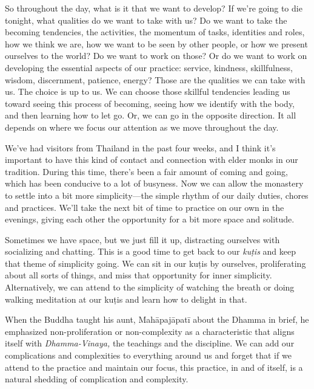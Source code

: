 So throughout the day, what is it that we want to develop? If we're 
going to die tonight, what qualities do we want to take with us? Do we 
want to take the becoming tendencies, the activities, the momentum of 
tasks, identities and roles, how we think we are, how we want to be 
seen by other people, or how we present ourselves to the world? Do we 
want to work on those? Or do we want to work on developing the 
essential aspects of our practice: service, kindness, skillfulness, 
wisdom, discernment, patience, energy? Those are the qualities we can 
take with us. The choice is up to us. We can choose those skillful 
tendencies leading us toward seeing this process of becoming, seeing 
how we identify with the body, and then learning how to let go. Or, we 
can go in the opposite direction. It all depends on where we focus our 
attention as we move throughout the day.


We've had visitors from Thailand in the past four weeks, and I think 
it's important to have this kind of contact and connection with elder 
monks in our tradition. During this time, there's been a fair amount of 
coming and going, which has been conducive to a lot of busyness. Now we 
can allow the monastery to settle into a bit more simplicity---the 
simple rhythm of our daily duties, chores and practices. We'll take the 
next bit of time to practice on our own in the evenings, giving each 
other the opportunity for a bit more space and solitude.

Sometimes we have space, but we just fill it up, distracting ourselves 
with socializing and chatting. This is a good time to get back to our 
\emph{kuṭis} and keep that theme of simplicity going. We can sit in 
our kuṭis by ourselves, proliferating about all sorts of things, and 
miss that opportunity for inner simplicity. Alternatively, we can 
attend to the simplicity of watching the breath or doing walking 
meditation at our kuṭis and learn how to delight in that.

When the Buddha taught his aunt, Mahāpajāpatī about the Dhamma in 
brief, he emphasized non-proliferation or non-complexity as a 
characteristic that aligns itself with \emph{Dhamma-Vinaya,} the 
teachings and the discipline. We can add our complications and 
complexities to everything around us and forget that if we attend to 
the practice and maintain our focus, this practice, in and of itself, 
is a natural shedding of complication and complexity.

